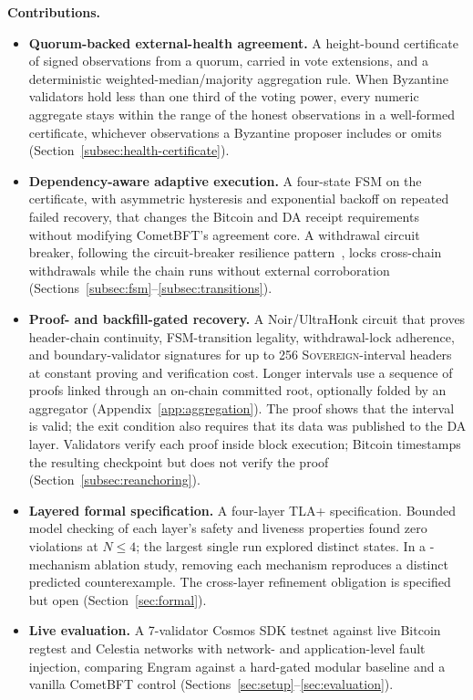 \textbf{Contributions.}
\begin{itemize}
    \item \textbf{Quorum-backed external-health agreement.} A height-bound
    certificate of signed observations from a quorum,
    carried in vote extensions, and a deterministic weighted-median/majority
    aggregation rule. When Byzantine validators hold less than one third of the voting power, every numeric aggregate stays within
    the range of the honest observations in a well-formed certificate,
    whichever observations a Byzantine proposer includes or omits
    (Section~\ref{subsec:health-certificate}).
    \item \textbf{Dependency-aware adaptive execution.} A four-state FSM on the
    certificate, with asymmetric hysteresis and exponential backoff on repeated
    failed recovery, that changes the Bitcoin and DA receipt requirements
    without modifying CometBFT's agreement core. A withdrawal circuit breaker,
    following the circuit-breaker resilience pattern~\cite{mendonca2020resiliency},
    locks cross-chain withdrawals while the chain runs without external
    corroboration (Sections~\ref{subsec:fsm}--\ref{subsec:transitions}).
    \item \textbf{Proof- and backfill-gated recovery.} A Noir/UltraHonk circuit
    that proves header-chain continuity, FSM-transition legality,
    withdrawal-lock adherence, and boundary-validator signatures for up to
    256 \textsc{Sovereign}-interval headers at constant proving and
    verification cost. Longer intervals use a sequence of proofs linked through
    an on-chain committed root, optionally folded by an aggregator
    (Appendix~\ref{app:aggregation}). The proof shows that the interval is
    valid; the exit condition also requires that its data was published to the
    DA layer. Validators verify each proof inside block execution; Bitcoin
    timestamps the resulting checkpoint but does not verify the proof
    (Section~\ref{subsec:reanchoring}).
    \item \textbf{Layered formal specification.} A four-layer TLA+
    specification. Bounded model checking of each layer's safety and liveness
    properties found zero violations at $N{\le}4$; the largest single run
    explored \resFSMStatesM{} distinct states. In a \resAblationCount-mechanism ablation study,
    removing each mechanism reproduces a distinct predicted counterexample. The
    cross-layer refinement obligation is specified but open
    (Section~\ref{sec:formal}).
    \item \textbf{Live evaluation.} A 7-validator Cosmos SDK testnet against
    live Bitcoin regtest and Celestia networks with network- and
    application-level fault injection, comparing Engram against a hard-gated
    modular baseline and a vanilla CometBFT control
    (Sections~\ref{sec:setup}--\ref{sec:evaluation}).
\end{itemize}

